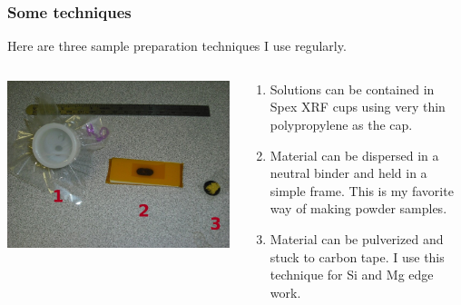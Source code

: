 \documentclass[10pt, xcolor=x11names, compress]{beamer}
\begin{document}
\begin{frame}
  \frametitle{Some techniques}

  Here are three sample preparation techniques I use regularly.

  \bigskip

  \begin{columns}
    \begin{column}{0.45\linewidth}
      \includegraphics[width=\linewidth]{sample/samples.jpg}
    \end{column}
    \begin{column}{0.55\linewidth}
      \begin{enumerate}
      \item Solutions can be contained in Spex XRF cups using very
        thin polypropylene as the cap.
      \item Material can be dispersed in a neutral binder and held in
        a simple frame.  This is my favorite way of making powder
        samples.
      \item Material can be pulverized and stuck to carbon tape.  I
        use this technique for Si and Mg edge work.
      \end{enumerate}
    \end{column}
  \end{columns}


\end{frame}
\end{document}
